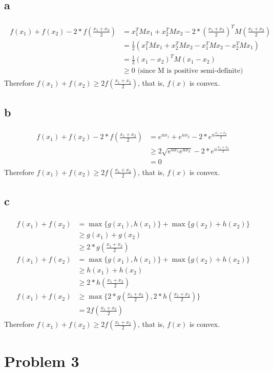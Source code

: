 \documentclass[a4paper,11pt]{article}
\theoremstyle{mytheor}
\newcommand{\myequ}[1]{\begin{align}\begin{split} #1 \end{split}\end{align}}
\begin{document}
\subsection*{a}
\myequ{
	f(x_1) + f(x_2) -  2 * f(\frac{x_1 + x_2}{2}) & = x_1^T M x_1 + x_2^T M x_2 - 
		2 * (\frac{x_1+x_2}{2})^T M (\frac{x_1+x_2}{2}) \\
		& =	\frac{1}{2} (x_1^T M x_1 + x_2^T M x_2 - x_1^T M x_2 - x_2^T M x_1) \\
		& = \frac{1}{2} (x_1-x_2)^T M (x_1-x_2) \\
		& \geq 0 \text{ (since M is positive semi-definite)}
}	
Therefore $f(x_1) + f(x_2) \geq 2 f(\frac{x_1+x_2}{2})$, that is, $f(x)$ is convex.

\subsection*{b}
\myequ{
	f(x_1) + f(x_2) -  2 * f(\frac{x_1 + x_2}{2}) &=
		e^{u x_1} + e^{u x_2} - 2 * e^{u \frac{x_1+x_2}{2}} \\
		& \geq 2 \sqrt{e^{u x_1} e^{u x_2}} - 2 * e^{u \frac{x_1+x_2}{2}} \\
		& = 0
}
Therefore $f(x_1) + f(x_2) \geq 2 f(\frac{x_1+x_2}{2})$, that is, $f(x)$ is convex.

\subsection*{c}
\myequ{
	f(x_1) + f(x_2) & = \max\{g(x_1), h(x_1)\} + \max\{g(x_2) + h(x_2)\}	\\
		&\geq g(x_1) + g(x_2) \\
		&\geq 2 * g(\frac{x_1 + x_2}{2}) \\
	f(x_1) + f(x_2) & = \max\{g(x_1), h(x_1)\} + \max\{g(x_2) + h(x_2)\}	\\
		&\geq h(x_1) + h(x_2) \\
		&\geq 2 * h(\frac{x_1 + x_2}{2})	\\
	f(x_1) + f(x_2) & \geq  \max\{2 * g(\frac{x_1 + x_2}{2}), 2 * h(\frac{x_1 + x_2}{2})\}\\
					& = 2 f(\frac{x_1 + x_2}{2}) 
}
Therefore $f(x_1) + f(x_2) \geq 2 f(\frac{x_1+x_2}{2})$, that is, $f(x)$ is convex.

\section*{Problem 3}
\end{document}
